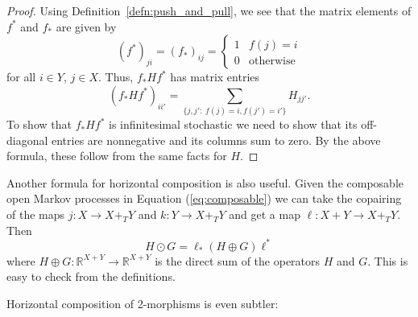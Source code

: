 \documentclass[oneside,final]{ucr}
\theoremstyle{definition}
\newcommand{\maps}{\colon}
\newcommand{\R}{\mathbb{R}}
\begin{document}
{\begin{proof}
Using Definition\ \ref{defn:push_and_pull}, we see that the matrix elements of $f^*$ and $f_*$ are
given by
\[               (f^*)_{ji} = (f_*)_{ij} = \left\{ \begin{array}{cc} 1 & f(j) = i \\  0 & \textrm{otherwise} 
                                   \end{array} \right.
\]
for all $i \in Y$, $j \in X$.  Thus, $f_* H f^*$ has matrix entries
\[               (f_* H f^*)_{ii'} = \sum_{ \{j,j': \;  f(j) = i, f(j') = i' \} } H_{jj'}  .\]
To show that $f_* H f^*$ is infinitesimal stochastic we need to show that its off-diagonal entries are nonnegative and its columns sum to zero.  By the above formula, these follow from the same facts for $H$.
\end{proof}

Another formula for horizontal composition is also useful.  Given the composable open Markov processes in Equation (\ref{eq:composable}) we can take the copairing of the maps $j \maps X \to X +_T Y$ and $k \maps Y \to X +_T Y$ and get a map $\ell \maps X + Y \to X +_T Y$.   Then 
\begin{equation}
\label{eq:odot2}
H \odot G = \ell_* (H \oplus G) \ell^*  
\end{equation}
where $H \oplus G \maps \R^{X + Y} \to \R^{X + Y}$ is the direct sum of the operators $H$ and $G$.   This is easy to check from the definitions.

Horizontal composition of 2-morphisms is even subtler:

}
\end{document}
